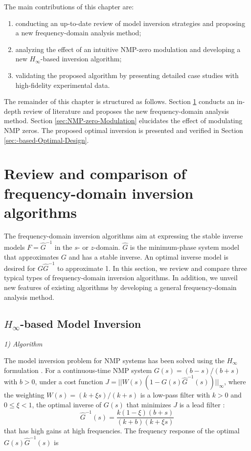 \documentclass [11pt, proquest] {uwthesis}[2020/02/24]
\begin{document}
The main contributions of this chapter are:
\begin{enumerate}
\item conducting an up-to-date review of model inversion strategies and
proposing a new frequency-domain analysis method;
\item analyzing the effect of an intuitive NMP-zero modulation and developing
a new $H_{\infty}$-based inversion algorithm;
\item validating the proposed algorithm by presenting detailed case studies
with high-fidelity experimental data.
\end{enumerate}
The remainder of this chapter is structured as follows. Section \ref{sec:Review-of-Relevant}
conducts an in-depth review of literature and proposes the new frequency-domain
analysis method. Section \ref{sec:NMP-zero-Modulation} elucidates
the effect of modulating NMP zeros. The proposed optimal inversion
is presented and verified in Section \ref{sec:-based-Optimal-Design}.

\section{Review and comparison of frequency-domain inversion algorithms} \label{sec:Review-of-Relevant}

The frequency-domain inversion algorithms aim at expressing the stable
inverse models $F=\hat{G}^{-1}$ in the $s$- or $z$-domain. $\hat{G}$ is the minimum-phase system model that approximates
$G$ and has a stable inverse. An optimal inverse model is desired
for $G\hat{G}^{-1}$ to approximate 1. In this section, we review
and compare three typical types of frequency-domain inversion algorithms.
In addition, we unveil new features of existing algorithms by developing
a general frequency-domain analysis method.

\subsection{$H_{\infty}$-based Model Inversion} \label{subsec:-based-model-inversion}

\noindent \emph{1) Algorithm}

The model inversion problem for NMP systems has been solved using
the $H_{\infty}$ formulation \cite{francis_h_1984,zheng2017design,zheng2018systematic}.
For a continuous-time NMP system $G(s)=(b-s)/(b+s)$ with $b>0$,
under a cost function $J=||W(s)(1-G(s)\hat{G}^{-1}(s))||_{\infty}$,
where the weighting $W(s)=(k+\xi s)/(k+s)$ is a low-pass filter with
$k>0$ and $0\leq\xi<1$, the optimal inverse of $G(s)$ that minimizes
$J$ is a lead filter \cite{francis_h_1984}:
\begin{equation}
\hat{G}^{-1}(s)=\frac{k(1-\xi)(b+s)}{(k+b)(k+\xi s)}\label{eq:output_stable-1}
\end{equation}
that has high gains at high frequencies. The frequency response of
the optimal $G(s)\hat{G}^{-1}(s)$ is
\end{document}
